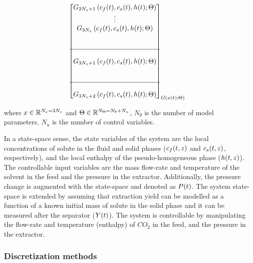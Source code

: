 \documentclass[../Article_Model_Parameters.tex]{subfiles}
\begin{document}
{\begin{align*}
{\begin{bmatrix}
							{\color{black}G_{2N_z+1}} \left( {\color{black}c_f}(t),{\color{black}c_s}(t),{\color{black}h}(t); {\color{black}\Theta} \right) \\
							\vdots\\
							{\color{black}G_{3N_z}} \left( {\color{black}c_f}(t),{\color{black}c_s}(t),{\color{black}h}(t); {\color{black}\Theta} \right) \\ 
							\\ \\ \hline \\
							{\color{black}G_{3N_z+1}} \left( {\color{black}c_f}(t),{\color{black}c_s}(t),{\color{black}h}(t); {\color{black}\Theta} \right) \\
							\\ \\ \hline \\
							{\color{black}G_{3N_z+2}} \left( {\color{black}c_f}(t),{\color{black}c_s}(t),{\color{black}h}(t); {\color{black}\Theta} \right) 
					\end{bmatrix}}_{{\color{black}G} \left( {\color{black}x}(t); {\color{black}\Theta} \right)} 
			\end{align*} }
			
			where ${\color{black}x} \in \mathbb{R}^{N_x = 3N_z} $ and ${\color{black}\Theta} \in \mathbb{R}^{N_\Theta =  N_{\theta} + N_u } $, $N_{\theta}$ is the number of model parameters, $N_{u}$ is the number of control variables.
			
			In a state-space sense, the state variables of the system are the local concentrations of solute in the fluid and solid phases (${\color{black}c_f}(t,z)$ and ${\color{black}c_s}(t,z)$, respectively), and the local enthalpy of the pseudo-homogeneous phase (${\color{black}h}(t,z)$). The controllable input variables are the mass flow-rate and temperature of the solvent in the feed and the pressure in the extractor. Additionally, the pressure change is augmented with the state-space and denoted as ${\color{black}P}(t)$.
			The system state-space is extended by assuming that extraction yield can be modelled as a function of a known initial mass of solute in the solid phase and it can be measured after the separator (${\color{black}Y}(t)$). The system is controllable by manipulating the flow-rate and temperature (enthalpy) of $CO_2$ in the feed, and the pressure in the extractor.
			
			\subsubsection{Discretization methods}
			
\end{document}
